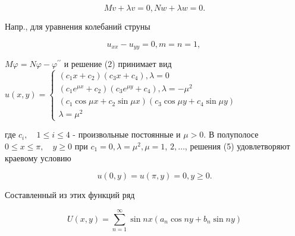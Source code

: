 \documentclass[10pt]{article}
\begin{document}
\[

M v+\lambda v=0, N w+\lambda w=0 .

\]



Напр., для уравнения колебаний струны



\[

u_{x x}-u_{y y}=0, m=n=1 \text {, }

\]



$M \varphi=N \varphi-\varphi^{\prime \prime}$ и решение (2) принимает вид $u(x, y)=\left\{\begin{array}{l}\left(c_{1} x+c_{2}\right)\left(c_{3} x+c_{4}\right), \lambda=0 \\ \left(c_{1} e^{\mu x}+c_{2}\right)\left(c_{3} e^{\mu y}+c_{4}\right), \lambda=-\mu^{2} \\ \left(c_{1} \cos \mu x+c_{2} \sin \mu x\right)\left(c_{3} \cos \mu y+c_{4} \sin \mu y\right) \\ \lambda=\mu^{2}\end{array}\right.$



где $c_{i}, \quad 1 \leqslant i \leqslant 4$ - произвольные постоянные и $\mu>0$. В полуполосе $0 \leqslant x \leqslant \pi, \quad y \geqslant 0$ при $c_{1}=0, \lambda=\mu^{2}, \mu=1$, $2, \ldots$, решения (5) удовлетворяют краевому условию



\[

u(0, y)=u(\pi, y)=0, y \geqslant 0 .

\]



Составленный из этих функций ряд



\[

U(x, y)=\sum_{n=1}^{\infty} \sin n x\left(a_{n} \cos n y+b_{n} \sin n y\right)

\]
\end{document}
